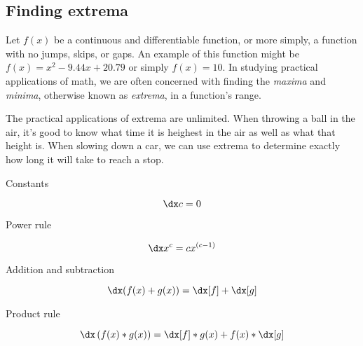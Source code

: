 \subsection{Finding extrema}
Let $f(x)$ be a continuous and differentiable function, or more simply, a function with no jumps, skips, or gaps. An example of this function might be $f(x)=x^2 - 9.44x + 20.79$ or simply $f(x) = 10$. In studying practical applications of math, we are often concerned with finding the \emph{maxima} and \emph{minima}, otherwise known as \emph{extrema}, in a function's range.

The practical applications of extrema are unlimited. When throwing a ball in the air, it's good to know what time it is heighest in the air as well as what that height is. When slowing down a car, we can use extrema to determine exactly how long it will take to reach a stop.

\begin{psec}{Constants}

    \begin{equation}\label{eq:derivative constant}
        \dx c = 0
    \end{equation}

\end{psec}

\begin{psec}{Power rule}

    \begin{equation}\label{eq:derivative power}
        \dx x^c = c x^{(c - 1)}
    \end{equation}

\end{psec}

\begin{psec}{Addition and subtraction}

    \begin{equation}\label{eq:derivative add}
        \dx (f(x) + g(x)) = \dx[f] + \dx[g]
    \end{equation}

\end{psec}

\begin{psec}{Product rule}

    \begin{equation}\label{eq:derivative prod}
        \dx \left(f(x)*g(x)\right) = \dx[f] *  g(x) + f(x) *
        \dx[g]
    \end{equation}

\end{psec}

